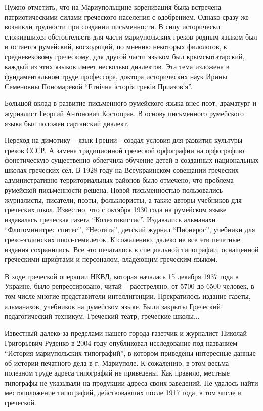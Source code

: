 
Нужно отметить, что на Мариупольщине коренизация была встречена патриотическими
силами греческого населения  с одобрением. Однако сразу же возникли трудности
при создании письменности. В силу исторически сложившихся обстоятельств для
части мариупольских греков родным языком был и остается румейский, восходящий,
по мнению некоторых филологов,  к средневековому греческому,  для другой части
языком был крымскотатарский, каждый из этих языков имеет несколько диалектов.
Эта тема изложена в фундаментальном труде профессора, доктора исторических наук
Ирины Семеновны Пономаревой \enquote{Етнічна історія греків Приазов'я}.

Большой  вклад  в развитие письменного румейского языка внес поэт, драматург и
журналист Георгий Антонович Костоправ. В основу письменного румейского языка
был положен сартанский диалект.

Переход на димотику – язык Греции - создал условия для развития культуры греков
СССР. А замена традиционной греческой  орфографии на орфографию фонетическую
существенно облегчила обучение детей в созданных национальных школах греческих
сел. В 1928 году на Всеукраинском совещании греческих
административно-территориальных районов было отмечено, что проблема румейской
письменности решена. Новой  письменностью пользовались журналисты, писатели,
поэты, фольклористы, а также авторы учебников для греческих школ. Известно, что
с октября 1930 года на румейском  языке издавалась греческая газета
\enquote{Колехтивистис}.  Издавались альманахи \enquote{Флогоминитрес спитес}, \enquote{Неотита},
детский журнал \enquote{Пионерос}, учебники для греко-эллинских школ-семилеток. К
сожалению, далеко не все эти печатные издания сохранились. Все это печаталось в
специальной типографии, оснащенной греческими шрифтами и персоналом, владеющим
греческим языком.

В ходе греческой операции НКВД, которая началась 15 декабря 1937 года в
Украине, было репрессировано, читай – расстреляно,  от  5700  до  6500
человек, в том числе многие представители интеллигенции.  Прекратилось издание
газеты, альманахов, учебников на румейском языке. Были закрыты Греческий
педагогический техникум, Греческий театр, греческие школы...

Известный далеко за пределами нашего города газетчик и журналист Николай
Григорьевич Руденко в 2004 году опубликовал исследование под названием \enquote{История
мариупольских типографий}, в котором приведены интересные данные об истории
печатного дела в г. Мариуполе. К сожалению,  в этом весьма полезном труде
адреса типографий не приведены. Как правило, местные типографы не указывали на
продукции  адреса своих заведений. Не удалось найти местоположение типографий,
действовавших после 1917 года, в том числе и греческой.

